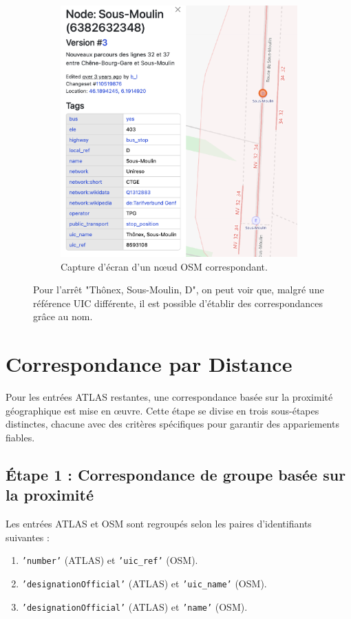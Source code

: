 \begin{figure}[h]
\begin{subfigure}[b]{0.45\textwidth}
        \includegraphics[width=\textwidth]{../figures/correspondances/name_osm.png}
        \caption[Nœud OSM – exemple]{Capture d'écran d'un nœud OSM correspondant.}
        \label{fig:name_osm}
    \end{subfigure}
    \caption[Exemple de correspondance par nom]{Pour l'arrêt "Thônex, Sous-Moulin, D", on peut voir que, malgré une référence UIC différente, il est possible d'établir des correspondances grâce au nom.}
    \label{fig:name_matching_example}
\end{figure}


\section{Correspondance par Distance}

Pour les entrées ATLAS restantes, une correspondance basée sur la proximité géographique est mise en œuvre. Cette étape se divise en trois sous-étapes distinctes, chacune avec des critères spécifiques pour garantir des appariements fiables.

\subsection{Étape 1 : Correspondance de groupe basée sur la proximité}
Les entrées ATLAS et OSM sont regroupés selon les paires d’identifiants suivantes :
\begin{enumerate}
    \item \texttt{'number'} (ATLAS) et \texttt{'uic\_ref'} (OSM).
    \item \texttt{'designationOfficial'} (ATLAS) et \texttt{'uic\_name'} (OSM).
    \item \texttt{'designationOfficial'} (ATLAS) et \texttt{'name'} (OSM).
\end{enumerate}


